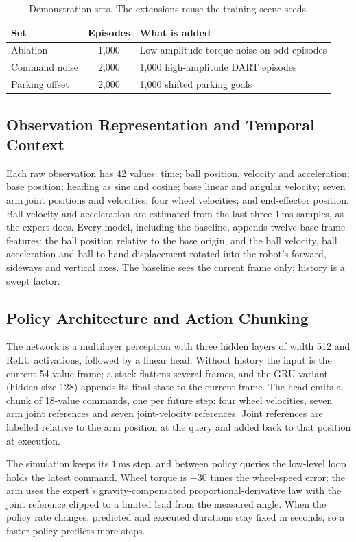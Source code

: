 \documentclass[conference]{IEEEtran}
\begin{document}
\begin{table}[t]
\centering
\caption{Demonstration sets. The extensions reuse the training scene seeds.}
\label{tab:datasets}
\footnotesize
\begin{tabular}{lcl}
\toprule
Set & Episodes & What is added \\
\midrule
Ablation & 1,000 & Low-amplitude torque noise on odd episodes \\
Command noise & 2,000 & 1,000 high-amplitude DART episodes \\
Parking offset & 2,000 & 1,000 shifted parking goals \\
\bottomrule
\end{tabular}
\end{table}

\subsection{Observation Representation and Temporal Context}
Each raw observation has 42 values: time; ball position, velocity and acceleration; base position; heading as sine and cosine; base linear and angular velocity; seven arm joint positions and velocities; four wheel velocities; and end-effector position. Ball velocity and acceleration are estimated from the last three $1\,\mathrm{ms}$ samples, as the expert does. Every model, including the baseline, appends twelve base-frame features: the ball position relative to the base origin, and the ball velocity, ball acceleration and ball-to-hand displacement rotated into the robot's forward, sideways and vertical axes. The baseline sees the current frame only; history is a swept factor.

\subsection{Policy Architecture and Action Chunking}
The network is a multilayer perceptron with three hidden layers of width 512 and ReLU activations, followed by a linear head. Without history the input is the current 54-value frame; a stack flattens several frames, and the GRU variant (hidden size 128) appends its final state to the current frame. The head emits a chunk of 18-value commands, one per future step: four wheel velocities, seven arm joint references and seven joint-velocity references. Joint references are labelled relative to the arm position at the query and added back to that position at execution.

The simulation keeps its $1\,\mathrm{ms}$ step, and between policy queries the low-level loop holds the latest command. Wheel torque is $-30$ times the wheel-speed error; the arm uses the expert's gravity-compensated proportional-derivative law with the joint reference clipped to a limited lead from the measured angle. When the policy rate changes, predicted and executed durations stay fixed in seconds, so a faster policy predicts more steps.
\end{document}
